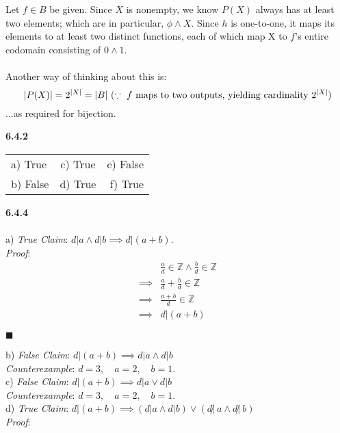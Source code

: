 \documentclass[12pt]{article}
\begin{document}
Let $f \in B$ be given. Since $X$ is nonempty, we know $P(X)$ always has at least two elements; which are in particular, $\phi \land X$. Since $h$ is one-to-one, it maps its elements to at least two distinct functions, each of which map X to $f$'s entire codomain consisting of $0 \land 1$.\\\\
Another way of thinking about this is: $$|P(X)|=2^{|X|}=|B|\ (\because\ f\ \textnormal{maps to two outputs, yielding cardinality}\ 2^{|X|})$$...as required for bijection.
\pagebreak

\textbf{6.4.2}
\begin{center}
\begin{tabular}{ l c r }
a) True & c) True & e) False\\
b) False & d) True & f) True
\end{tabular}
\end{center}
\textbf{6.4.4}\\\\
a) \emph{True Claim}: $d|a \land d|b \implies d|(a+b)$.\\

\emph{Proof}:
\begin{align*}
&\frac{a}{d} \in \mathbb{Z} \land \frac{b}{d} \in \mathbb{Z}\\
\implies& \frac{a}{d} + \frac{b}{d} \in \mathbb{Z}\\
\implies& \frac{a+b}{d} \in \mathbb{Z}\\
\implies& d|(a+b)
\end{align*}
\begin{flushright}
$\blacksquare$
\end{flushright}
b) \emph{False Claim}: $d|(a+b) \implies d|a \land d|b$\\

\emph{Counterexample}: $d=3, \quad a=2, \quad b=1$.\\

c) \emph{False Claim}: $d|(a+b) \implies d|a \lor d|b$\\

\emph{Counterexample}: $d=3, \quad a=2, \quad b=1$.\\

d) \emph{True Claim}: $d|(a+b) \implies (d|a \land d|b) \lor (d\not|\ a \land d\not|\ b)$\\

\emph{Proof}:\\
\end{document}
